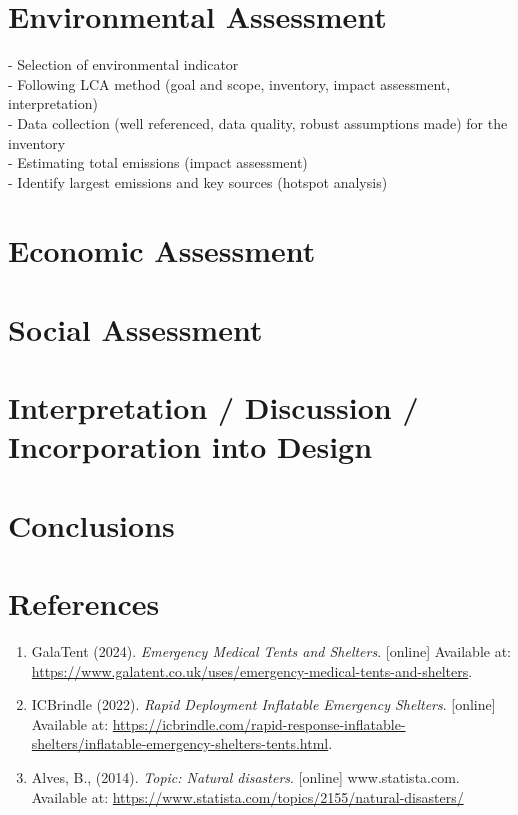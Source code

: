 \documentclass{article}
\begin{document}
\newpage

\section{Environmental Assessment}
- Selection of environmental indicator\\
- Following LCA method (goal and scope, inventory, impact assessment, interpretation)\\
- Data collection (well referenced, data quality, robust assumptions made) for the inventory\\
- Estimating total emissions (impact assessment)\\
- Identify largest emissions and key sources (hotspot analysis)


\newpage

\section{Economic Assessment}

\newpage

\section{Social Assessment}

\newpage

\section{Interpretation / Discussion / Incorporation into Design}

\newpage

\section{Conclusions}

\newpage


\section{References}
\normalsize
\begin{enumerate}
\item GalaTent (2024). \textit{Emergency Medical Tents and Shelters}. [online] Available at: \url{https://www.galatent.co.uk/uses/emergency-medical-tents-and-shelters}.
\item ICBrindle (2022). \textit{Rapid Deployment Inflatable Emergency Shelters}. [online] Available at: \url{https://icbrindle.com/rapid-response-inflatable-shelters/inflatable-emergency-shelters-tents.html}.
\item Alves, B., (2014). \textit{Topic: Natural disasters}. [online] www.statista.com. Available at: \url{https://www.statista.com/topics/2155/natural-disasters/}
\end{enumerate}
	
\end{document}
